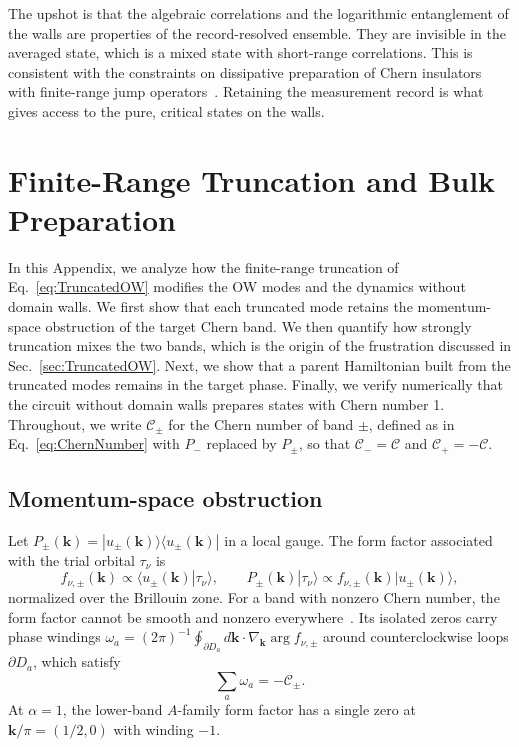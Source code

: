 \documentclass[aps,prb,twocolumn,superscriptaddress,longbibliography,floatfix]{revtex4-2}
\newcommand{\mc}[1]{\mathcal{#1}}
\newcommand{\bk}{\boldsymbol k}
\begin{document}
The upshot is that the algebraic correlations and the logarithmic entanglement of the walls are properties of the record-resolved ensemble. They are invisible in the averaged state, which is a mixed state with short-range correlations. This is consistent with the constraints on dissipative preparation of Chern insulators with finite-range jump operators~\cite{Goldstein2019}. Retaining the measurement record is what gives access to the pure, critical states on the walls.

\appendix

\section{Finite-Range Truncation and Bulk Preparation}
\label{app:Truncation}

In this Appendix, we analyze how the finite-range truncation of Eq.~\eqref{eq:TruncatedOW} modifies the OW modes and the dynamics without domain walls. We first show that each truncated mode retains the momentum-space obstruction of the target Chern band. We then quantify how strongly truncation mixes the two bands, which is the origin of the frustration discussed in Sec.~\ref{sec:TruncatedOW}. Next, we show that a parent Hamiltonian built from the truncated modes remains in the target phase. Finally, we verify numerically that the circuit without domain walls prepares states with Chern number 1. Throughout, we write $\mc C_\pm$ for the Chern number of band $\pm$, defined as in Eq.~\eqref{eq:ChernNumber} with $P_-$ replaced by $P_\pm$, so that $\mc C_-=\mc C$ and $\mc C_+=-\mc C$.

\subsection{Momentum-space obstruction}

Let $P_\pm(\bk)=|u_\pm(\bk)\rangle\langle u_\pm(\bk)|$ in a local gauge. The form factor associated with the trial orbital $\tau_\nu$ is
\begin{equation}
    f_{\nu,\pm}(\bk)\propto\langle u_\pm(\bk)|\tau_\nu\rangle,
    \qquad
    P_\pm(\bk)|\tau_\nu\rangle\propto f_{\nu,\pm}(\bk)|u_\pm(\bk)\rangle,
    \label{eq:FormFactor}
\end{equation}
normalized over the Brillouin zone. For a band with nonzero Chern number, the form factor cannot be smooth and nonzero everywhere~\cite{BhuiyanPanJian2026}. Its isolated zeros carry phase windings $\omega_a=(2\pi)^{-1}\oint_{\partial D_a}d\bk\cdot\nabla_{\bk}\arg f_{\nu,\pm}$ around counterclockwise loops $\partial D_a$, which satisfy
\begin{equation}
    \sum_a\omega_a=-\mc C_\pm.
    \label{eq:ZeroWinding}
\end{equation}
At $\alpha=1$, the lower-band $A$-family form factor has a single zero at $\bk/\pi=(1/2,0)$ with winding $-1$.
\end{document}
